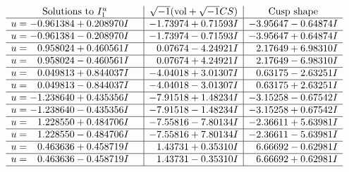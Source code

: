 \documentclass[1p]{elsarticle_modified}
\theoremstyle{definition}
\newcommand{\I}{\sqrt{-1}}
\begin{document}
$$\begin{array}{c|c|c}  
\text{Solutions to }I^u_{1}& \I (\text{vol} + \sqrt{-1}CS) & \text{Cusp shape}\\
 \hline 
\begin{aligned}
u &= -0.961384 + 0.208970 I\end{aligned}
 & -1.73974 + 0.71593 I & -3.95647 - 0.64874 I \\ \hline\begin{aligned}
u &= -0.961384 - 0.208970 I\end{aligned}
 & -1.73974 - 0.71593 I & -3.95647 + 0.64874 I \\ \hline\begin{aligned}
u &= \phantom{-}0.958024 + 0.460561 I\end{aligned}
 & \phantom{-}0.07674 - 4.24921 I & \phantom{-}2.17649 + 6.98310 I \\ \hline\begin{aligned}
u &= \phantom{-}0.958024 - 0.460561 I\end{aligned}
 & \phantom{-}0.07674 + 4.24921 I & \phantom{-}2.17649 - 6.98310 I \\ \hline\begin{aligned}
u &= \phantom{-}0.049813 + 0.844037 I\end{aligned}
 & -4.04018 + 3.01307 I & \phantom{-}0.63175 - 2.63251 I \\ \hline\begin{aligned}
u &= \phantom{-}0.049813 - 0.844037 I\end{aligned}
 & -4.04018 - 3.01307 I & \phantom{-}0.63175 + 2.63251 I \\ \hline\begin{aligned}
u &= -1.238640 + 0.435356 I\end{aligned}
 & -7.91518 + 1.48234 I & -3.15258 - 0.67542 I \\ \hline\begin{aligned}
u &= -1.238640 - 0.435356 I\end{aligned}
 & -7.91518 - 1.48234 I & -3.15258 + 0.67542 I \\ \hline\begin{aligned}
u &= \phantom{-}1.228550 + 0.484706 I\end{aligned}
 & -7.55816 - 7.80134 I & -2.36611 + 5.63981 I \\ \hline\begin{aligned}
u &= \phantom{-}1.228550 - 0.484706 I\end{aligned}
 & -7.55816 + 7.80134 I & -2.36611 - 5.63981 I \\ \hline\begin{aligned}
u &= \phantom{-}0.463636 + 0.458719 I\end{aligned}
 & \phantom{-}1.43731 + 0.35310 I & \phantom{-}6.66692 - 0.62981 I \\ \hline\begin{aligned}
u &= \phantom{-}0.463636 - 0.458719 I\end{aligned}
 & \phantom{-}1.43731 - 0.35310 I & \phantom{-}6.66692 + 0.62981 I\\
 \hline 
 \end{array}$$\newpage
\end{document}
